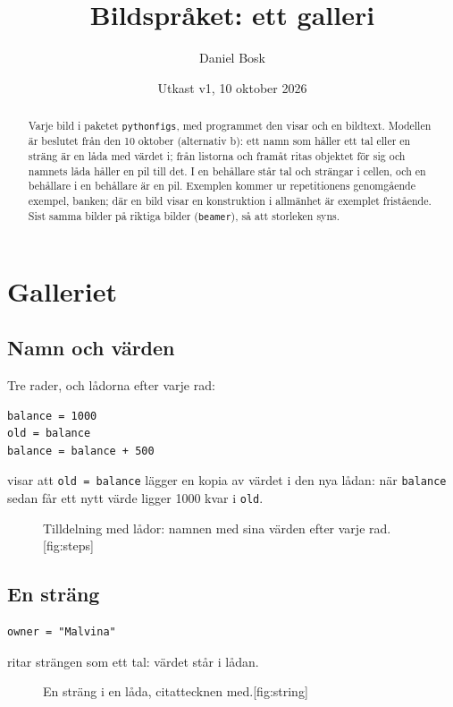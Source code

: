 \documentclass[a4paper,10pt,oneside,openright,
               oldfontcommands]{memoir}
\newcommand{\entry}[3]{%
  \begin{figure}[htbp]
    \begin{sidecaption}{#2}[fig:#1]
      #3
    \end{sidecaption}
  \end{figure}
}
\begin{document}
\title{Bildspråket: ett galleri}
\author{Daniel Bosk}
\date{Utkast v1, 10 oktober 2026}
\maketitle

\begin{abstract}
  Varje bild i paketet \texttt{pythonfigs}, med programmet den visar och
  en bildtext.  Modellen är beslutet från den 10 oktober (alternativ b):
  ett namn som håller ett tal eller en sträng är en låda med värdet i;
  från listorna och framåt ritas objektet för sig och namnets låda håller
  en pil till det.  I en behållare står tal och strängar i cellen, och en
  behållare i en behållare är en pil.  Exemplen kommer ur repetitionens
  genomgående exempel, banken; där en bild visar en konstruktion i
  allmänhet är exemplet fristående.  Sist samma bilder på riktiga
  bilder (\texttt{beamer}), så att storleken syns.
\end{abstract}

\clearpage
\tableofcontents*

\chapter{Galleriet}

\section{Namn och värden}

Tre rader, och lådorna efter varje rad:
\begin{verbatim}
balance = 1000
old = balance
balance = balance + 500
\end{verbatim}
 visar att \texttt{old = balance} lägger en
kopia av värdet i den nya lådan: när \texttt{balance} sedan
får ett nytt värde ligger 1000 kvar i \texttt{old}.
\entry{steps}{Tilldelning med lådor: namnen med sina värden efter
  varje rad.}{\figBoxSteps}

\section{En sträng}

\begin{verbatim}
owner = "Malvina"
\end{verbatim}
 ritar strängen som ett tal: värdet står i lådan.
\entry{string}{En sträng i en låda, citattecknen med.}{\figString}
\end{document}
